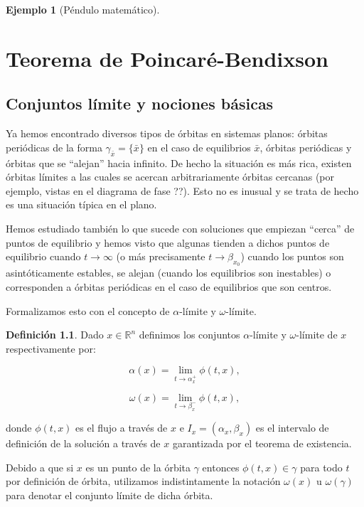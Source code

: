\documentclass[11pt]{book}
\theoremstyle{definition}
\newtheorem{definition}{Definición}
\numberwithin{definition}{section}
\theoremstyle{theorem}
\numberwithin{theorem}{section}
\numberwithin{lemma}{section}
\numberwithin{corollary}{section}
\theoremstyle{plain}
\newtheorem{example}{Ejemplo}
\numberwithin{example}{section}
\newcommand{\R}{{\ensuremath{\mathbb{R}}}}
\begin{document}
\begin{example}[Péndulo matemático] \label{ej:estabilidadpendulo}

\end{example}


\chapter{Teorema de Poincaré-Bendixson}

\section{Conjuntos límite y nociones básicas}

Ya hemos encontrado diversos tipos de órbitas en sistemas planos: órbitas periódicas de la forma $\gamma_{\bar{x}} = \{\bar{x}\}$ en el caso de equilibrios $\bar{x}$, órbitas periódicas y órbitas que se ``alejan'' hacia infinito.
De hecho la situación es más rica, existen órbitas límites a las cuales se acercan arbitrariamente órbitas cercanas (por ejemplo, vistas en el diagrama de fase ??). Esto no es inusual y se trata de hecho es una situación típica en el plano.

Hemos estudiado también lo que sucede con soluciones que empiezan ``cerca'' de puntos de equilibrio y hemos visto que algunas tienden a dichos puntos de equilibrio cuando $t \to \infty$ (o más precisamente $t \to \beta_{x_0}$) cuando los puntos son asintóticamente estables, se alejan (cuando los equilibrios son inestables) o corresponden a órbitas periódicas en el caso de equilibrios que son centros.

Formalizamos esto con el concepto de $\alpha$-límite y $\omega$-límite.

\begin{definition}Dado $x \in \R^n$ definimos los conjuntos $\alpha$-límite y $\omega$-límite de $x$ respectivamente por:

$$
	\alpha(x) = \lim_{t \to \alpha_{x}^+}{\phi(t,x)},
$$

$$
	\omega(x) = \lim_{t \to \beta_{x}^-}{\phi(t,x)},
$$

donde $\phi(t,x)$ es el flujo a través de $x$ e $I_x = (\alpha_x, \beta_x)$ es el intervalo de definición de la solución a través de $x$ garantizada por el teorema de existencia.
\end{definition}

Debido a que si $x$ es un punto de la órbita $\gamma$ entonces $\phi(t,x) \in \gamma$ para todo $t$ por definición de órbita, utilizamos indistintamente la notación $\omega(x)$ u $\omega(\gamma)$ para denotar el conjunto límite de dicha órbita.
\end{document}
